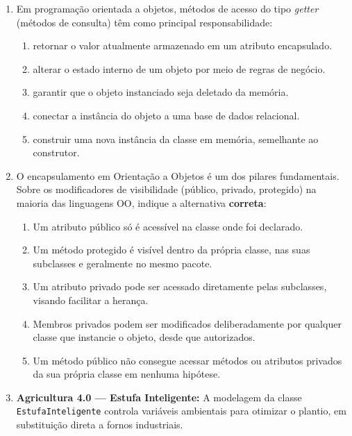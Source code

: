 \documentclass[12pt,a4paper]{article}
\begin{document}
\begin{enumerate}
    \vspace{0.3cm}

    \item Em programação orientada a objetos, métodos de acesso do tipo \textit{getter} (métodos de consulta) têm como principal responsabilidade:
    \begin{enumerate}[label=\Alph*)]
        \item retornar o valor atualmente armazenado em um atributo encapsulado.
        \item alterar o estado interno de um objeto por meio de regras de negócio.
        \item garantir que o objeto instanciado seja deletado da memória.
        \item conectar a instância do objeto a uma base de dados relacional.
        \item construir uma nova instância da classe em memória, semelhante ao construtor.
    \end{enumerate}

    \vspace{0.3cm}

    \item  O encapsulamento em Orientação a Objetos é um dos pilares fundamentais. Sobre os modificadores de visibilidade (público, privado, protegido) na maioria das linguagens OO, indique a alternativa \textbf{correta}:
    \begin{enumerate}[label=\Alph*)]
        \item Um atributo público só é acessível na classe onde foi declarado.
        \item Um método protegido é visível dentro da própria classe, nas suas subclasses e geralmente no mesmo pacote.
        \item Um atributo privado pode ser acessado diretamente pelas subclasses, visando facilitar a herança.
        \item Membros privados podem ser modificados deliberadamente por qualquer classe que instancie o objeto, desde que autorizados.
        \item Um método público não consegue acessar métodos ou atributos privados da sua própria classe em nenhuma hipótese.
    \end{enumerate} 

    \vspace{0.3cm}

    \item \textbf{Agricultura 4.0 — Estufa Inteligente:} A modelagem da classe \texttt{EstufaInteligente} controla variáveis ambientais para otimizar o plantio, em substituição direta a fornos industriais.


\end{enumerate}
\end{document}
